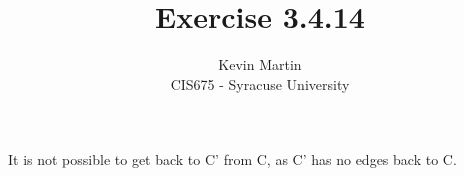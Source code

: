\documentclass{article}
\author{Kevin Martin\\ CIS675 - Syracuse University}
\title{Exercise 3.4.14}
\begin{document}
\maketitle
It is not possible to get back to C' from C, as C' has no edges back to C.
\end{document}
